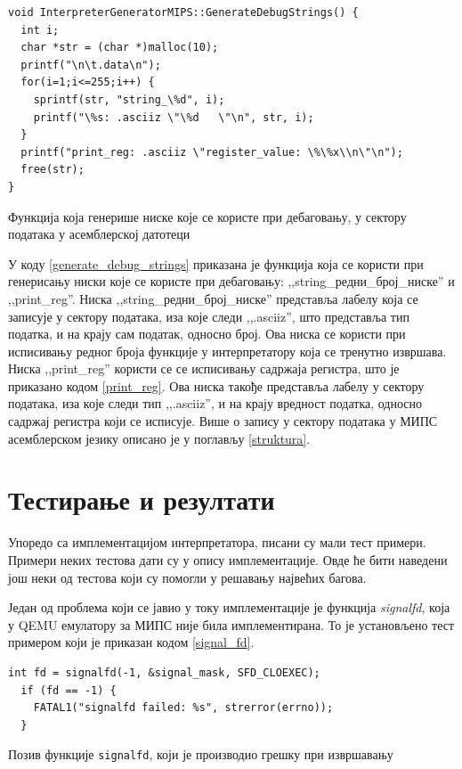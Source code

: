\documentclass[12pt,oneside]{memoir}
\begin{document}
\begin{listing}
\begin{verbatim}
void InterpreterGeneratorMIPS::GenerateDebugStrings() {
  int i;
  char *str = (char *)malloc(10);
  printf("\n\t.data\n");
  for(i=1;i<=255;i++) {
    sprintf(str, "string_\%d", i);
    printf("\%s: .asciiz \"\%d   \"\n", str, i);
  }
  printf("print_reg: .asciiz \"register_value: \%\%x\\n\"\n");
  free(str);
}
\end{verbatim}
\caption{Функција која генерише ниске које се користе при дебаговању, у сектору података у асемблерској датотеци }
\label{generate_debug_strings}
\end{listing}

У коду \ref{generate_debug_strings} приказана је функција која се користи при генерисању ниски које се користе при дебаговању: ,,string\_редни\_број\_ниске'' и ,,print\_reg''. Ниска  ,,string\_редни\_број\_ниске'' представља лабелу која се записује у сектору података, иза које следи ,,.asciiz'', што представља тип податка, и на крају сам податак, односно број. Ова ниска се користи при исписивању редног броја функције у интерпретатору која се тренутно извршава.
Ниска ,,print\_reg'' користи се се исписивању садржаја регистра, што је приказано кодом \ref{print_reg}. Ова ниска такође представља лабелу у сектору података, иза које следи тип ,,.asciiz'', и на крају вредност податка, односно садржај регистра који се исписује. Више о запису у сектору података у МИПС асемблерском језику описано је у поглављу \ref{struktura}.

\section{Тестирање и резултати}
\label{testiranje}
Упоредо са имплементацијом интерпретатора, писани су мали тест примери. Примери неких тестова дати су у опису имплементације. Овде ће бити наведени још неки од тестова који су помогли у решавању највећих багова.

Један од проблема који се јавио у току имплементације је функција \textit{signalfd}, која у QEMU емулатору за МИПС није била имплементирана. То је установљено тест примером који је приказан кодом \ref{signal_fd}.\\

\begin{listing}
\begin{verbatim}
int fd = signalfd(-1, &signal_mask, SFD_CLOEXEC);
  if (fd == -1) {
    FATAL1("signalfd failed: %s", strerror(errno));
  }
\end{verbatim}
\caption{Позив функције \texttt{signalfd}, који је производио грешку при извршавању }
\label{signal_fd}
\end{listing}
\end{document}
